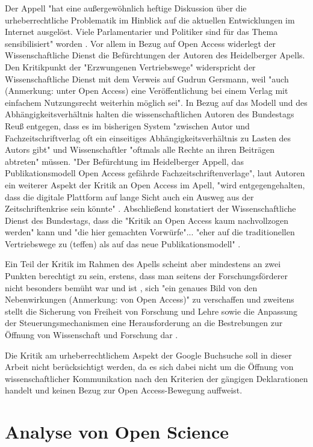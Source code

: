 Der Appell "hat eine außergewöhnlich heftige Diskussion über die urheberrechtliche Problematik im Hinblick auf die aktuellen Entwicklungen im Internet ausgelöst. Viele Parlamentarier und Politiker sind für das Thema sensibilisiert" worden \cite{WD_bundestag_2009}. Vor allem in Bezug auf Open Access widerlegt der Wissenschaftliche Dienst die Befürchtungen der Autoren des Heidelberger Apells. Den Kritikpunkt der "Erzwungenen Vertriebswege" widerspricht der Wissenschaftliche Dienst mit dem Verweis auf Gudrun Gersmann, weil "auch (Anmerkung: unter Open Access) eine Veröffentlichung bei einem Verlag mit einfachem Nutzungsrecht weiterhin möglich sei". In Bezug auf das Modell und des Abhängigkeitsverhältnis halten die wissenschaftlichen Autoren des Bundestags Reuß entgegen, dass es im bisherigen System "zwischen Autor und Fachzeitschriftverlag oft ein einseitiges Abhängigkeitsverhältnis zu Lasten des Autors gibt" und Wissenschaftler "oftmals alle Rechte an ihren Beiträgen abtreten" \cite{WD_bundestag_2009} müssen. "Der Befürchtung im Heidelberger Appell, das Publikationsmodell Open Access gefährde Fachzeitschriftenverlage", laut Autoren ein weiterer Aspekt der Kritik an Open Access im Apell, "wird entgegengehalten, dass die digitale Plattform auf lange Sicht auch ein Ausweg aus der Zeitschriftenkrise sein könnte" \cite{WD_bundestag_2009}. Abschließend konstatiert der Wissenschaftliche Dienst des Bundestags, dass die "Kritik an Open Access kaum nachvollzogen werden" kann und "die hier gemachten Vorwürfe"... "eher auf die traditionellen Vertriebswege zu (teffen) als auf das neue Publikationsmodell" \cite{WD_bundestag_2009}.

Ein Teil der Kritik im Rahmen des Apells scheint aber mindestens an zwei Punkten berechtigt zu sein, erstens, dass man seitens der Forschungsförderer nicht besonders bemüht war und ist \cite{suchen}, sich "ein genaues Bild von den Nebenwirkungen (Anmerkung: von Open Access)" \cite{Reuss_2009} zu verschaffen und zweitens stellt die Sicherung von Freiheit von Forschung und Lehre sowie die Anpassung der Steuerungsmechanismen eine Herausforderung an die Bestrebungen zur Öffnung von Wissenschaft und Forschung dar \cite{suchen}.

Die Kritik am urheberrechtlichem Aspekt der Google Buchsuche soll in dieser Arbeit nicht berücksichtigt werden, da es sich dabei nicht um die Öffnung von wissenschaftlicher Kommunikation nach den Kriterien der gängigen Deklarationen handelt und keinen Bezug zur Open Access-Bewegung auffweist. 


\section{Analyse von Open Science} 


